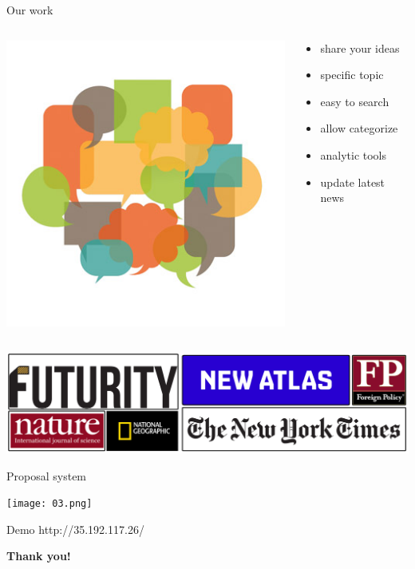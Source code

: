 \documentclass{beamer}
\begin{document}
\begin{frame}{Our work}
\begin{columns}
	\begin{column}{0.5\textwidth}
		\includegraphics[scale=0.4]{02.jpg}
	\end{column}
	\begin{column}{0.5\textwidth}
		\begin{itemize}
			\item share your ideas
			\item specific topic
			\item easy to search
			\item allow categorize
			\item analytic tools
			\item update latest news 
		\end{itemize}
	\end{column}
\end{columns}
\includegraphics[scale=0.07]{mag.png}
\end{frame}

\begin{frame}{Proposal system}
	\begin{center}
		\texttt{[image: 03.png]}
	\end{center}
\end{frame}

\begin{frame}{Demo}
	\centering http://35.192.117.26/
\end{frame}

\begin{frame}
	\centering \huge \textbf{Thank you!}
\end{frame}
\end{document}
